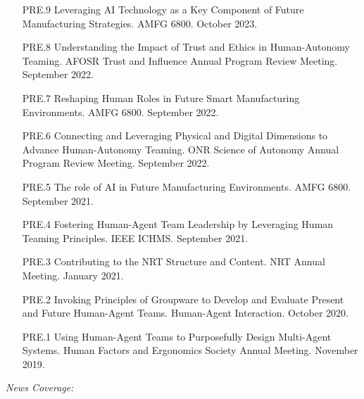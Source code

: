 \begin{itemize}[align=left, labelwidth=3em,]
\item[PRE.9] Leveraging AI Technology as a Key Component of Future Manufacturing Strategies. AMFG 6800. October 2023. \\

\item[PRE.8] Understanding the Impact of Trust and Ethics in Human-Autonomy Teaming. AFOSR Trust and Influence Annual Program Review Meeting. September 2022. \\

\item[PRE.7] Reshaping Human Roles in Future Smart Manufacturing Environments. AMFG 6800. September 2022. \\



\item[PRE.6] Connecting and Leveraging Physical and Digital Dimensions to Advance Human-Autonomy Teaming. ONR Science of Autonomy Annual Program Review Meeting. September 2022. \\

\item[PRE.5] The role of AI in Future Manufacturing Environments. AMFG 6800. September 2021. \\

\item[PRE.4] Fostering Human-Agent Team Leadership by Leveraging Human Teaming Principles. IEEE ICHMS. September 2021. \\

\item[PRE.3] Contributing to the NRT Structure and Content. NRT Annual Meeting. January 2021. \\

\item[PRE.2] Invoking Principles of Groupware to Develop and Evaluate Present and Future Human-Agent Teams. Human-Agent Interaction. October 2020. \\

\item[PRE.1] Using Human-Agent Teams to Purposefully Design Multi-Agent Systems. Human Factors and Ergonomics Society Annual Meeting. November 2019.

\end{itemize}


\bigskip \noindent
\textit{News Coverage:}
\bigskip \noindent


